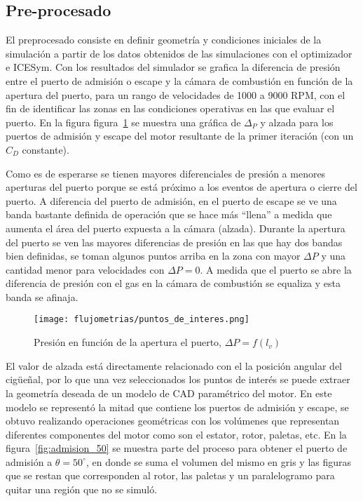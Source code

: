 
\subsection{Pre-procesado}
%
El preprocesado consiste en definir geometría y condiciones iniciales de la
simulación a partir de los datos obtenidos de las simulaciones con el
optimizador e ICESym.
%
Con los resultados del simulador se grafica la diferencia de presión entre el
puerto de admisión o escape y la cámara de combustión en función de la apertura
del puerto, para un rango de velocidades de 1000 a 9000 RPM, con el fin de
identificar las zonas en las condiciones operativas en las que evaluar el puerto.
%
En la figura figura~\ref{fig:puntos_interes} se muestra una gráfica de
$\Delta_{P}$ y alzada para los puertos de admisión y escape del motor resultante
de la primer iteración (con un $C_{D}$ constante).

Como es de esperarse se tienen mayores diferenciales de presión a menores
aperturas del puerto porque se está próximo a los eventos de apertura o cierre
del puerto.
%
A diferencia del puerto de admisión, en el puerto de escape se ve una banda
bastante definida de operación que se hace más ``llena'' a medida que aumenta el
área del puerto expuesta a la cámara (alzada).
%
Durante la apertura del puerto se ven las mayores diferencias de presión en las
que hay dos bandas bien definidas, se toman algunos puntos arriba en la zona con
mayor $\Delta P$ y una cantidad menor para velocidades con $\Delta P = 0$.
%
A medida que el puerto se abre la diferencia de presión con el gas en la cámara
de combustión se equaliza y esta banda se afinaja.

\begin{figure}
    \centering
    \texttt{[image: flujometrias/puntos\_de\_interes.png]}
    \caption{Presión en función de la apertura el puerto,
$\Delta P = f(l_{v})$}\label{fig:puntos_interes}
\end{figure}

%
El valor de alzada está directamente relacionado con el la posición angular del
cigüeñal, por lo que una vez seleccionados los puntos de interés se puede
extraer la geometría deseada de un modelo de CAD paramétrico del motor.
%
En este modelo se representó la mitad que contiene los puertos de admisión y
escape, se obtuvo realizando operaciones geométricas con los volúmenes que
representan diferentes componentes del motor como son el estator, rotor,
paletas, etc.
%
En la figura~\ref{fig:admision_50} se muestra parte del proceso para obtener el
puerto de admisión a $\theta=50^{\circ}$, en donde se suma el volumen del mismo
en gris y las figuras que se restan que corresponden al rotor, las paletas y un
paralelogramo para quitar una región que no se simuló.

